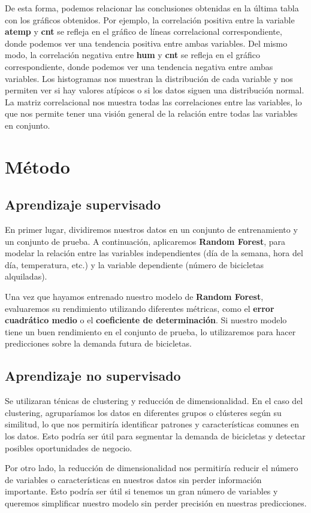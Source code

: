 \documentclass{wsdcr}
\begin{document}
De esta forma, podemos relacionar las conclusiones obtenidas en la última tabla con los gráficos obtenidos. Por ejemplo, la correlación positiva entre la variable \textbf{atemp} y \textbf{cnt} se refleja en el gráfico de líneas correlacional correspondiente, donde podemos ver una tendencia positiva entre ambas variables. Del mismo modo, la correlación negativa entre \textbf{hum} y \textbf{cnt} se refleja en el gráfico correspondiente, donde podemos ver una tendencia negativa entre ambas variables. Los histogramas nos muestran la distribución de cada variable y nos permiten ver si hay valores atípicos o si los datos siguen una distribución normal. La matriz correlacional nos muestra todas las correlaciones entre las variables, lo que nos permite tener una visión general de la relación entre todas las variables en conjunto.\section{Método}

\subsection{Aprendizaje supervisado}
En primer lugar, dividiremos nuestros datos en un conjunto de entrenamiento y un conjunto de prueba. A continuación, aplicaremos \textbf{Random Forest}, para modelar la relación entre las variables independientes (día de la semana, hora del día, temperatura, etc.) y la variable dependiente (número de bicicletas alquiladas).

Una vez que hayamos entrenado nuestro modelo de \textbf{Random Forest}, evaluaremos su rendimiento utilizando diferentes métricas, como el \textbf{error cuadrático medio} o el \textbf{coeficiente de determinación}. Si nuestro modelo tiene un buen rendimiento en el conjunto de prueba, lo utilizaremos para hacer predicciones sobre la demanda futura de bicicletas.
\subsection{Aprendizaje no supervisado}
Se utilizaran ténicas de clustering y reducción de dimensionalidad.
En el caso del clustering, agruparíamos los datos en diferentes grupos o clústeres según su similitud, lo que nos permitiría identificar patrones y características comunes en los datos. Esto podría ser útil para segmentar la demanda de bicicletas y detectar posibles oportunidades de negocio.

Por otro lado, la reducción de dimensionalidad nos permitiría reducir el número de variables o características en nuestros datos sin perder información importante. Esto podría ser útil si tenemos un gran número de variables y queremos simplificar nuestro modelo sin perder precisión en nuestras predicciones.
\end{document}
